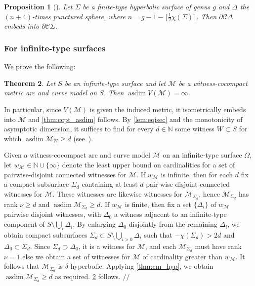 \documentclass[twoside]{amsart}
\theoremstyle{plain}
\newtheorem{theorem}{Theorem}[section]
\newtheorem{proposition}[theorem]{Proposition}
\theoremstyle{break}
\theoremstyle{definition}
\theoremstyle{remark}
\newcommand{\N}{\mathbb{N}}
\newcommand{\sqed}{\hfill $/\!\!/$}
\DeclareMathOperator{\asdim}{asdim}
\newcommand{\cc}{\mathcal C}
\newcommand{\M}{\mathcal M}
\begin{document}
\begin{proposition}[{\cite[Prop.~4.23]{ga_asdim}}]\label{prop:elSembed}
   Let $\Sigma$ be a finite-type hyperbolic surface of genus $g$ 
   and $\Delta$ the $(n+4)$-times punctured sphere, where $n = g - 1 -
  \lceil \frac 12 \chi(\Sigma) \rceil$. Then
   $\partial \cc \Delta$ embeds into $\partial \cc \Sigma$.
 \end{proposition}

\subsubsection{For infinite-type surfaces}\label{sec:asdim_it}

We prove the following:

\begin{theorem}\label{thm:ccpt_met_asdim}
  Let $S$ be an infinite-type surface and let $\M$ be
  a witness-cocompact metric arc and curve model on $S$. Then
  $\asdim V(\mathcal{M}) = \infty$.
\end{theorem}
\noindent
In particular, since $V(\M)$ is given the induced metric, it
isometrically embeds into $\M$ and \cref{thm:ccpt_asdim} follows.
By \cref{lem:eqisec} and the monotonicity of asymptotic dimension, 
it suffices to find for every $d \in \N$ some witness $W \subset S$
for which $\asdim \M_W \geq d$ (see\ \cite[\S 4.3.2]{ga_asdim}). 

Given a witness-cocompact arc and curve model $\M$ on an infinite-type surface
$\Omega$, let $w_\M \in \N\cup \{\infty\}$ denote the least upper
bound on cardinalities for a set of pairwise-disjoint 
connected witnesses for $\M$. If $w_\M$ is infinite, then for each
$d$ fix a compact subsurface $\Sigma_d$ containing at least $d$
pair-wise disjoint connected witnesses for $\M$. These witnesses are
likewise witnesses for $\M_{\Sigma_d}$, hence $\M_{\Sigma_d}$ has
rank $\nu \geq d$ and $\asdim \M_{\Sigma_d} \geq d$.  If $w_\M$ is
finite, then fix a set $\{\Delta_i\}$ of $w_\M$ pairwise disjoint witnesses, 
with $\Delta_0$ a witness adjacent to an infinite-type component of
$S \setminus \bigcup_i \Delta_i$.  By enlarging $\Delta_0$
disjointly from the remaining $\Delta_i$, we obtain
compact subsurfaces $\Sigma_d \subset S \setminus \bigcup_{i > 0}
\Delta_i$ such that $-\chi(\Sigma_d) > 2d$ and $\Delta_0 \subset
\Sigma_d$.  Since $\Sigma_d \supset \Delta_0$, it is a witness for
$\M$, and each $\M_{\Sigma_d}$ must have rank $\nu = 1$ else we
obtain a set of witnesses for $\M$ of cardinality greater than $w_\M$. It
follows that $\M_{\Sigma_d}$ is $\delta$-hyperbolic.  Applying
\cref{thm:cm_hyp}, we obtain $\asdim \M_{\Sigma_d} \geq d$ as
required. \cref{thm:ccpt_met_asdim} follows. 
\sqed
\end{document}
